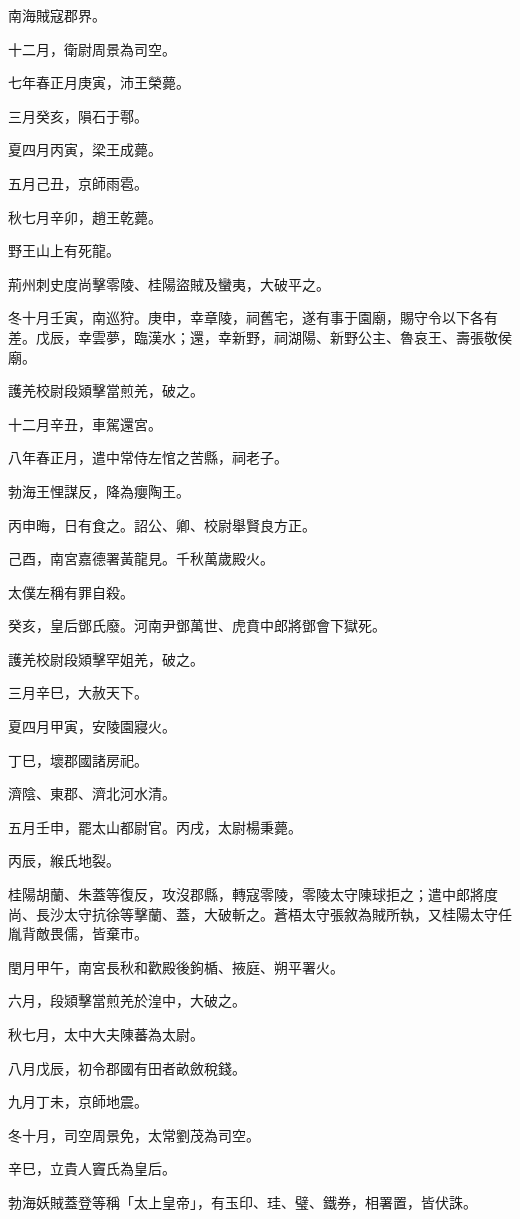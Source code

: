 \begin{pinyinscope}
南海賊寇郡界。

十二月，衛尉周景為司空。

七年春正月庚寅，沛王榮薨。

三月癸亥，隕石于鄠。

夏四月丙寅，梁王成薨。

五月己丑，京師雨雹。

秋七月辛卯，趙王乾薨。

野王山上有死龍。

荊州刺史度尚擊零陵、桂陽盜賊及蠻夷，大破平之。

冬十月壬寅，南巡狩。庚申，幸章陵，祠舊宅，遂有事于園廟，賜守令以下各有差。戊辰，幸雲夢，臨漢水；還，幸新野，祠湖陽、新野公主、魯哀王、壽張敬侯廟。

護羌校尉段熲擊當煎羌，破之。

十二月辛丑，車駕還宮。

八年春正月，遣中常侍左悺之苦縣，祠老子。

勃海王悝謀反，降為癭陶王。

丙申晦，日有食之。詔公、卿、校尉舉賢良方正。

己酉，南宮嘉德署黃龍見。千秋萬歲殿火。

太僕左稱有罪自殺。

癸亥，皇后鄧氏廢。河南尹鄧萬世、虎賁中郎將鄧會下獄死。

護羌校尉段熲擊罕姐羌，破之。

三月辛巳，大赦天下。

夏四月甲寅，安陵園寢火。

丁巳，壞郡國諸房祀。

濟陰、東郡、濟北河水清。

五月壬申，罷太山都尉官。丙戌，太尉楊秉薨。

丙辰，緱氏地裂。

桂陽胡蘭、朱蓋等復反，攻沒郡縣，轉寇零陵，零陵太守陳球拒之；遣中郎將度尚、長沙太守抗徐等擊蘭、蓋，大破斬之。蒼梧太守張敘為賊所執，又桂陽太守任胤背敵畏儒，皆棄市。

閏月甲午，南宮長秋和歡殿後鉤楯、掖庭、朔平署火。

六月，段熲擊當煎羌於湟中，大破之。

秋七月，太中大夫陳蕃為太尉。

八月戊辰，初令郡國有田者畝斂稅錢。

九月丁未，京師地震。

冬十月，司空周景免，太常劉茂為司空。

辛巳，立貴人竇氏為皇后。

勃海妖賊蓋登等稱「太上皇帝」，有玉印、珪、璧、鐵券，相署置，皆伏誅。


\end{pinyinscope}

